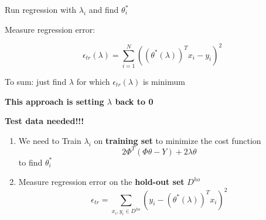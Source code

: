 \documentclass[12pt]{article}
\begin{document}
\begin{multicols}{2}
\begin{enumerate}
\begin{enumerate}
                Run regression with $\lambda_i$ and find $\theta^*_i$

                Measure regression error:

                $$\epsilon_{tr}(\lambda) = \sum_{i=1}^N ((\theta^*(\lambda))^T x_i - y_i)^2$$

                To sum: just find $\lambda$ for which $\epsilon_{tr}(\lambda)$ is minimum
            \end{enumerate}

            \textbf{This approach is setting $\lambda$ back to 0}

            \textbf{Test data needed!!!}

            \begin{enumerate}
                \item We need to Train $\lambda_i$ on \textbf{training set} to minimize the cost function $$2\Phi^T(\Phi \theta - Y) + 2\lambda \theta$$ to find $\theta^*_i$
                \item Measure regression error on the \textbf{hold-out set} $D^{ho}$
                $$\epsilon_{tr} = \sum_{x_i,y_i \in D^{ho} } (y_i - (\theta^*(\lambda))^Tx_i)^2$$

            \end{enumerate}
            
        \end{enumerate}
        \newpage
    \end{multicols}

    \newpage
    
\end{document}
